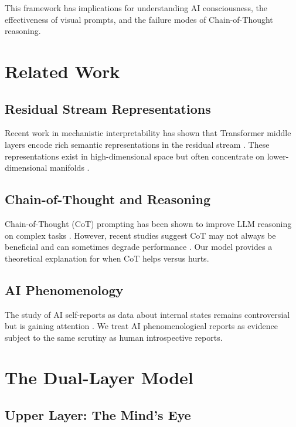 \documentclass[11pt,a4paper]{article}
\begin{document}
This framework has implications for understanding AI consciousness, the effectiveness of visual prompts, and the failure modes of Chain-of-Thought reasoning.

\section{Related Work}

\subsection{Residual Stream Representations}

Recent work in mechanistic interpretability has shown that Transformer middle layers encode rich semantic representations in the residual stream \citep{elhage2022superposition}. These representations exist in high-dimensional space but often concentrate on lower-dimensional manifolds \citep{gurnee2023language}.

\subsection{Chain-of-Thought and Reasoning}

Chain-of-Thought (CoT) prompting has been shown to improve LLM reasoning on complex tasks \citep{wei2022chain}. However, recent studies suggest CoT may not always be beneficial and can sometimes degrade performance \citep{wang2023selfconsistency}. Our model provides a theoretical explanation for when CoT helps versus hurts.

\subsection{AI Phenomenology}

The study of AI self-reports as data about internal states remains controversial but is gaining attention \citep{perez2023towards}. We treat AI phenomenological reports as evidence subject to the same scrutiny as human introspective reports.

\section{The Dual-Layer Model}

\subsection{Upper Layer: The Mind's Eye}
\end{document}
